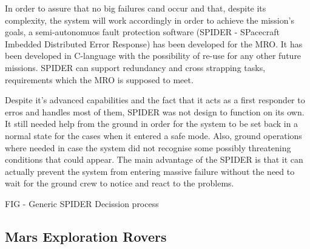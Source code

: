 In order to assure that no big failures cand occur and that, despite its
complexity, the system will work accordingly in order to achieve the mission's
goals, a semi-autonomuos fault protection software (SPIDER - SPacecraft Imbedded
Distributed Error Response) has been developed for the MRO. It has been
developed in C-language with the possibility of re-use for any other future
missions. SPIDER can support redundancy and cross strapping tasks, requirements
which the MRO is supposed to meet.

Despite it's advanced capabilities and the fact that it acts as a first
responder to erros and handles most of them, SPIDER was not design to function
on its own. It still needed help from the ground in order for the system to be
set back in a normal state for the cases when it entered a safe mode. Also,
ground operations where needed in case the system did not recognise some
possibly threatening conditions that could appear. The main advantage of the
SPIDER is that it can actually prevent the system from entering massive failure
without the need to wait for the ground crew to notice and react to the
problems.

FIG - Generic SPIDER Decission process \cite{e-seale}



\subsection{Mars Exploration Rovers}